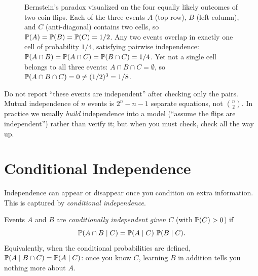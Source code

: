 \begin{figure}[H]
\caption{Bernstein's paradox visualized on the four equally likely outcomes of two coin flips. Each of the three events $A$ (top row), $B$ (left column), and $C$ (anti-diagonal) contains two cells, so $\P(A)=\P(B)=\P(C)=1/2$. Any two events overlap in exactly one cell of probability $1/4$, satisfying pairwise independence: $\P(A\cap B)=\P(A\cap C)=\P(B\cap C)=1/4$. Yet not a single cell belongs to all three events: $A \cap B \cap C = \emptyset$, so $\P(A\cap B\cap C) = 0 \ne (1/2)^3 = 1/8$.}
\label{ch04:fig-bernstein}
\end{figure}

\begin{trapbox}
Do not report ``these events are independent'' after checking only the pairs. Mutual independence of $n$ events is $2^n - n - 1$ separate equations, not $\binom{n}{2}$. In practice we usually \emph{build} independence into a model (``assume the flips are independent'') rather than verify it; but when you must check, check all the way up.
\end{trapbox}

\section{Conditional Independence}
\label{ch04:cond-indep}

Independence can appear or disappear once you condition on extra information. This is captured by \emph{conditional independence}.

\begin{definition}
\label{ch04:def-cond-indep}
Events $A$ and $B$ are \emph{conditionally independent given $C$} (with $\P(C) > 0$) if
\[
\P(A \cap B \given C) = \P(A \given C)\,\P(B \given C).
\]
Equivalently, when the conditional probabilities are defined, $\P(A \given B \cap C) = \P(A \given C)$: once you know $C$, learning $B$ in addition tells you nothing more about $A$.
\end{definition}

